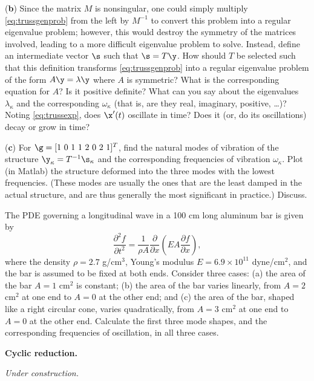 \begin{exercise}
\noindent ({\bf b}) 
Since the matrix $M$ is nonsingular, one could simply multiply \eqref{eq:trussgenprob} from the left by $M^{-1}$ to convert this problem into a regular eigenvalue problem;
however, this would destroy the symmetry of the matrices involved, leading to a more difficult eigenvalue problem to solve. Instead, define an
intermediate vector $\s$ such that $\s=T\y$.  How should $T$ be selected such that this definition transforms \eqref{eq:trussgenprob} into a regular eigenvalue problem
of the form $A\y=\lambda \y$ where $A$ is symmetric?  What is the corresponding equation for $A$?  Is it positive definite?  What can you say about 
the eigenvalues $\lambda_\kappa$ and the corresponding $\omega_\kappa$ (that is, are they real, imaginary, positive, \ldots)?  Noting \eqref{eq:trussexp}, does $\x'(t)$ oscillate in time?  Does it (or, do its oscillations) decay or grow in time?
\vskip0.1in

\noindent ({\bf c}) For $\g=[1\ 0\ 1\ 1\ 2\ 0\ 2\ 1]^T$, find the
natural modes of vibration of the structure $\y_\kappa=T^{-1} \s_\kappa$ and the corresponding frequencies of vibration
$\omega_\kappa$.  Plot (in Matlab) the structure deformed into the three modes with the lowest frequencies.
(These modes are usually the ones that are the least damped in the actual structure, and are thus generally the most significant in practice.)  Discuss.
\end{exercise}

\clearpage
\begin{exercise} \label{ex.nonuniformbar} \rm The PDE governing a longitudinal wave in a 100 cm long aluminum bar is given by
\begin{equation*}
\frac{\partial^2 f}{\partial t^2} = \frac{1}{\rho A} \frac{\partial}{\partial x}\left(E A \frac{\partial f}{\partial x}\right),
\end{equation*}
where the density $\rho=2.7$ g/cm$^3$, Young's modulus $E=6.9\times 10^{11}$ dyne/cm${}^2$, and the bar is assumed to be fixed at both ends.
Consider three cases: (a) the area of the bar $A=1$ cm${}^2$ is constant; (b) the area of the bar varies linearly, from $A=2$ cm${}^2$ at one end to $A=0$ at the other end;
and (c) the area of the bar, shaped like a right circular cone, varies quadratically, from $A=3$ cm${}^2$ at one end to $A=0$ at the other end.  Calculate the first
three mode shapes, and the corresponding frequencies of oscillation, in all three cases.\end{exercise}

\begin{exercise} \label{ex.4.cyclicreduction} \rm {\bf Cyclic reduction.}\vskip0.05in

{\it Under construction.}
\end{exercise}

